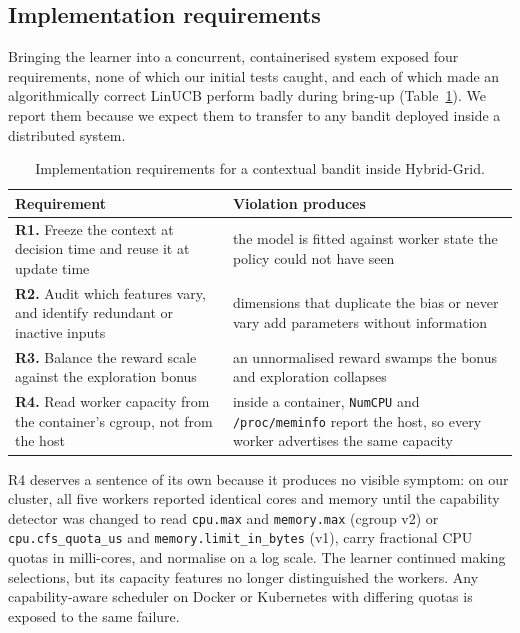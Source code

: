 \documentclass[final,5p,times,twocolumn]{elsarticle}
\begin{document}
\subsection{Implementation requirements}
\label{sec:reqs}

Bringing the learner into a concurrent, containerised system exposed four requirements, none of which our initial tests caught, and each of which made an algorithmically correct LinUCB perform badly during bring-up (Table~\ref{tab:reqs}). We report them because we expect them to transfer to any bandit deployed inside a distributed system.

\begin{table}[t]
\centering
\caption{Implementation requirements for a contextual bandit inside Hybrid-Grid.}
\label{tab:reqs}
\footnotesize
\begin{tabular}{p{7.4cm}p{8.6cm}}
\toprule
Requirement & Violation produces \\
\midrule
\textbf{R1.} Freeze the context at decision time and reuse it at update time & the model is fitted against worker state the policy could not have seen \\
\textbf{R2.} Audit which features vary, and identify redundant or inactive inputs & dimensions that duplicate the bias or never vary add parameters without information \\
\textbf{R3.} Balance the reward scale against the exploration bonus & an unnormalised reward swamps the bonus and exploration collapses \\
\textbf{R4.} Read worker capacity from the container's cgroup, not from the host & inside a container, \texttt{NumCPU} and \texttt{/proc/meminfo} report the host, so every worker advertises the same capacity \\
\bottomrule
\end{tabular}
\end{table}

R4 deserves a sentence of its own because it produces no visible symptom: on our cluster, all five workers reported identical cores and memory until the capability detector was changed to read \texttt{cpu.max} and \texttt{memory.max} (cgroup v2) or \texttt{cpu.cfs\_quota\_us} and \texttt{memory.limit\_in\_bytes} (v1), carry fractional CPU quotas in milli-cores, and normalise on a log scale. The learner continued making selections, but its capacity features no longer distinguished the workers. Any capability-aware scheduler on Docker or Kubernetes with differing quotas is exposed to the same failure.
\end{document}
